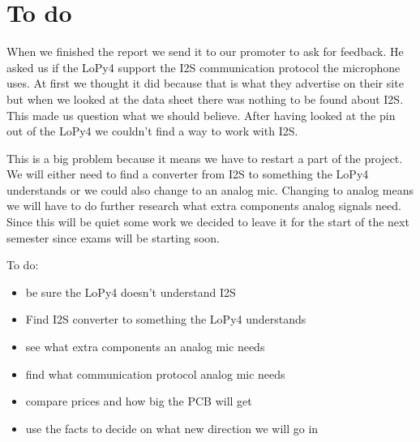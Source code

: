     \section{To do}
        When we finished the report we send it to our promoter to ask for feedback. He asked us if the LoPy4 support the I2S communication protocol the microphone uses. At first we thought it did because that is what they advertise on their site but when we looked at the data sheet there was nothing to be found about I2S. This made us question what we should believe. After having looked at the pin out of the LoPy4 we couldn't find a way to work with I2S.
        
        This is a big problem because it means we have to restart a part of the project. We will either need to find a converter from I2S to something the LoPy4 understands or we could also change to an analog mic. Changing to analog means we will have to do further research what extra components analog signals need. Since this will be quiet some work we decided to leave it for the start of the next semester since exams will be starting soon.
        

        To do:
        \begin{itemize}
            \item be sure the LoPy4 doesn't understand I2S
            \item Find I2S converter to something the LoPy4 understands
            \item see what extra components an analog mic needs
            \item find what communication protocol analog mic needs
            \item compare prices and how big the PCB will get
            \item use the facts to decide on what new direction we will go in
        \end{itemize}
        

    